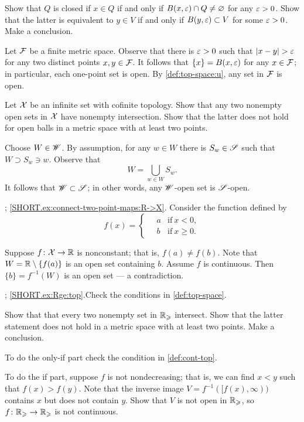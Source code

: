 \begin{multicols}{2}
Show that $Q$ is closed if $x\in Q$ if and only if $B(x,\varepsilon)\cap Q\ne\varnothing$ for any $\varepsilon>0$.
Show that the latter is equivalent to $y\in V$ if and only if $B(y,\varepsilon)\subset V$ for some $\varepsilon>0$.
Make a conclusion.

Let $\mathcal{F}$ be a finite metric space.
Observe that there is $\varepsilon>0$ such that $|x-y|>\eps$ for any two distinct points $x,y\in\mathcal{F}$.
It follows that $\{x\}=B(x,\varepsilon)$ for any $x\in\mathcal{F}$;
in particular, each one-point set is open.
By \ref{def:top-space:u}, any set in $\mathcal{F}$ is open.


Let $\mathcal{X}$ be an infinite set with cofinite topology.
Show that any two nonempty open sets in $\mathcal{X}$ have nonempty intersection.
Show that the latter does not hold for open balls in a metric space with at least two points.

Choose $W\in \mathscr{W}$.
By assumption, for any $w\in W$ there is $S_w\in \mathscr{S}$ such that $W\supset S_w\ni w$.
Observe that 
\[W=\bigcup_{w\in W}S_w.\]
It follows that $\mathscr{W}\subset \mathscr{S}$;
in other words, any $\mathscr{W}$-open set is $\mathscr{S}$-open.

\parbf{\ref{ex:connect-two-point-maps}}; \ref{SHORT.ex:connect-two-point-maps:R->X}.
Consider the function defined by
\[
f(x)=
\begin{cases}
\quad a &\text{if}\ x< 0,
\\
\quad b &\text{if}\ x\ge 0.
\end{cases}
\]

 Suppose $f\colon\mathcal{X}\to \mathbb{R}$ is nonconstant;
that is, $f(a)\ne f(b)$.
Note that $W=\mathbb{R}\setminus\{f(a)\}$ is an open set containing $b$.
Assume $f$ is continuous.
Then $\{b\}=f^{-1}(W)$ is an open set --- a contradiction.

\parbf{\ref{ex:Rge}}; \ref{SHORT.ex:Rge:top}.Check the conditions in \ref{def:top-space}.

Show that that every two nonempty set in $\mathbb{R}_\geqslant$ intersect.
Show that the latter statement does not hold in a metric space with at least two points.
Make a conclusion.

To do the only-if part check the condition in \ref{def:cont-top}.

To do the if part, suppose $f$ is not nondecreasing;
that is, we can find $x<y$ such that $f(x)>f(y)$.
Note that the inverse image $V=f^{-1}([f(x),\infty))$ contains $x$ but does not contain $y$.
Show that $V$ is not open in $\mathbb{R}_\geqslant$, so $f\colon\mathbb{R}_\geqslant\to\mathbb{R}_\geqslant$ is not continuous. 


\end{multicols}
